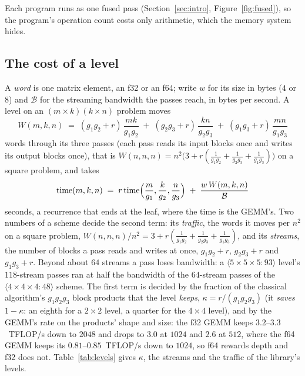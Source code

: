 \documentclass[11pt]{article}
\newcommand{\mm}[1]{\langle #1\rangle}
\begin{document}
Each program runs as one fused pass (Section~\ref{sec:intro},
Figure~\ref{fig:fused}), so the program's operation count costs only
arithmetic, which the memory system hides.


\subsection{The cost of a level}\label{sec:levelcost}

A \emph{word} is one matrix element, an f32 or an f64; write $w$ for its
size in bytes ($4$ or $8$) and $\mathcal{B}$ for the streaming bandwidth the
passes reach, in bytes per second.  A level on an $(m\times k)(k\times n)$ problem
moves
\begin{equation}\label{eq:traffic}
W(m,k,n) \;=\; (g_1g_2+r)\,\frac{mk}{g_1g_2} \;+\; (g_2g_3+r)\,\frac{kn}{g_2g_3}
\;+\; (g_1g_3+r)\,\frac{mn}{g_1g_3}
\end{equation}
words through its three passes (each pass reads its input blocks once and
writes its output blocks once), that is $W(n,n,n) = n^2\bigl(3 +
r(\tfrac{1}{g_1g_2} + \tfrac{1}{g_2g_3} + \tfrac{1}{g_1g_3})\bigr)$ on a
square problem, and takes
\begin{equation}\label{eq:level}
\text{time}(m,k,n) \;=\; r\,\text{time}\Bigl(\frac{m}{g_1},\frac{k}{g_2},
\frac{n}{g_3}\Bigr) \;+\; \frac{w\,W(m,k,n)}{\mathcal{B}}
\end{equation}
seconds, a recurrence that ends at the leaf, where the time is the GEMM's.
Two numbers of a scheme decide the second term: its \emph{traffic},
the words it moves per $n^2$ on a square problem, $W(n,n,n)/n^2 = 3 +
r(\tfrac{1}{g_1g_2} + \tfrac{1}{g_2g_3} + \tfrac{1}{g_1g_3})$, and its
\emph{streams}, the number of blocks a pass reads and writes
at once, $g_1g_2+r$, $g_2g_3+r$ and $g_1g_3+r$.  Beyond about $64$ streams a
pass loses bandwidth: a $\mm{5\times5\times5:93}$ level's $118$-stream passes
ran at half the bandwidth of the $64$-stream passes of the $\mm{4\times4\times4:48}$ scheme.
The first term is
decided by the fraction of the classical algorithm's $g_1g_2g_3$ block products that the level \emph{keeps}, $\kappa=r/(g_1g_2g_3)$ (it \emph{saves} $1-\kappa$: an eighth for a $2\times2$ level, a quarter for the $4\times4$ level), and by the GEMM's rate on the
products' shape and size: the f32 GEMM keeps $3.2$--$3.3$~TFLOP/s down to
$2048$ and drops to $3.0$ at $1024$ and $2.6$ at $512$, where the f64 GEMM
keeps its $0.81$--$0.85$~TFLOP/s down to $1024$, so f64 rewards depth and f32
does not.  Table~\ref{tab:levels} gives $\kappa$, the streams and the traffic of the library's levels.
\end{document}

